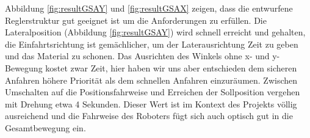 Abbildung \ref{fig:resultGSAY} und \ref{fig:resultGSAX} zeigen, dass die entwurfene Reglerstruktur gut geeignet ist um die Anforderungen zu erfüllen. Die Lateralposition (Abbildung \ref{fig:resultGSAY}) wird schnell erreicht und gehalten, die Einfahrtsrichtung ist gemächlicher, um der Laterausrichtung Zeit zu geben und das Material zu schonen. Das Ausrichten des Winkels ohne x- und y-Bewegung kostet zwar Zeit, hier haben wir uns aber entschieden dem sicheren Anfahren höhere Priorität als dem schnellen Anfahren einzuräumen. Zwischen Umschalten auf die Positionsfahrweise und Erreichen der Sollposition vergehen mit Drehung etwa 4 Sekunden. Dieser Wert ist im Kontext des Projekts völlig ausreichend und die Fahrweise des Roboters fügt sich auch optisch gut in die Gesamtbewegung ein.